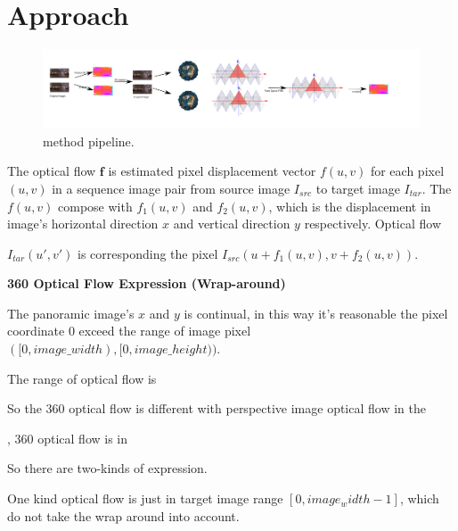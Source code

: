 \section{Approach}\label{sec:approach}

\begin{figure}[hbt!]
	\centering
	\includegraphics[width=0.95\linewidth]{images/method_pipeline_0.pdf}
	\caption{method pipeline. }
\label{fig:approach:pipeline}
\end{figure}




The optical flow $\textbf{f}$ is estimated pixel displacement vector $f(u,v)$ for each pixel $(u,v)$ in a sequence image pair from source image $I_{src}$ to target image $I_{tar}$.
The $f(u,v)$ compose with $f_1(u,v)$ and $f_2(u,v)$, which is the displacement in image's horizontal direction $x$ and vertical direction $y$ respectively.
Optical flow 

$I_{tar}(u',v')$ is corresponding the pixel $I_{src}(u + f_1(u,v), v + f_2(u,v))$.



\textbf{360 Optical Flow Expression (Wrap-around)}

The panoramic image's $x$ and $y$ is continual, in this way it's reasonable the pixel coordinate 0 exceed the range of image pixel $([0, image\_width), [0, image\_height))$. 

The range of optical flow is 

So the 360 optical flow is different with perspective image optical flow in the 

, 360 optical flow is  in 

So there are two-kinds of expression.

One kind optical flow is just in target image range $[0, image_width - 1]$, which do not take the wrap around into account.

